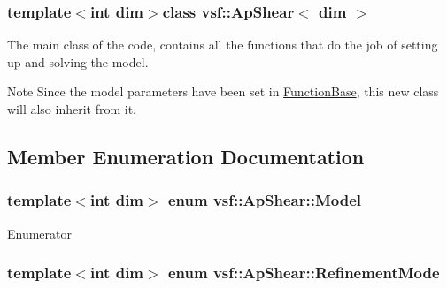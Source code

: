 \subsubsection*{template$<$int dim$>$class vsf\-::\-Ap\-Shear$<$ dim $>$}

The main class of the code, contains all the functions that do the job of setting up and solving the model.

\begin{DoxyNote}{Note}
Since the model parameters have been set in \hyperlink{classvsf_1_1FunctionBase}{Function\-Base}, this new class will also inherit from it. 
\end{DoxyNote}


\subsection{Member Enumeration Documentation}
\hypertarget{classvsf_1_1ApShear_a354ce33d5e60761e975bdb924119354d}{
\subsubsection[{Model}]{\setlength{\rightskip}{0pt plus 5cm}template$<$int dim$>$ enum {\bf vsf\-::\-Ap\-Shear\-::\-Model}}}\label{classvsf_1_1ApShear_a354ce33d5e60761e975bdb924119354d}
\begin{Desc}
\item[Enumerator]\par
\begin{description}
\item[{\em 
\hypertarget{classvsf_1_1ApShear_a354ce33d5e60761e975bdb924119354dab1d7d25f092b95270851c3cf1faa7bb5}{turcotte}\label{classvsf_1_1ApShear_a354ce33d5e60761e975bdb924119354dab1d7d25f092b95270851c3cf1faa7bb5}
}]\item[{\em 
\hypertarget{classvsf_1_1ApShear_a354ce33d5e60761e975bdb924119354da218f8a8439447f9d74a62070ad9086dc}{savage}\label{classvsf_1_1ApShear_a354ce33d5e60761e975bdb924119354da218f8a8439447f9d74a62070ad9086dc}
}]\end{description}
\end{Desc}
\hypertarget{classvsf_1_1ApShear_aef8049bf5f942237a19e8b88ddc19e8c}{
\subsubsection[{Refinement\-Mode}]{\setlength{\rightskip}{0pt plus 5cm}template$<$int dim$>$ enum {\bf vsf\-::\-Ap\-Shear\-::\-Refinement\-Mode}}}\label{classvsf_1_1ApShear_aef8049bf5f942237a19e8b88ddc19e8c}
